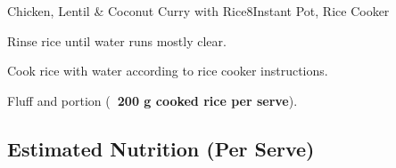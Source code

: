 \begin{recipe}{Chicken, Lentil \& Coconut Curry with Rice}{8}{Instant Pot, Rice Cooker}
\begin{method}
  \item Rinse rice until water runs mostly clear.
  \item Cook rice with water according to rice cooker instructions.
  \item Fluff and portion (\textbf{~200 g cooked rice per serve}).
\end{method}

\subsection*{Estimated Nutrition (Per Serve)}

\end{recipe}

